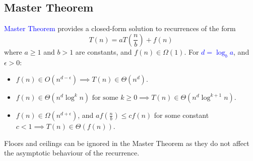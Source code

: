 \subsection{Master Theorem}
\textcolor{Blue}{Master Theorem} provides a \textcolor{Bittersweet}{closed-form solution} to recurrences of the form
\[T(n)=aT\left( \frac{n}{b} \right) +f(n)\] 
where $a\ge 1$ and $b>1$ are constants, and $f(n)\in\Omega\left( 1 \right) $.
For \textcolor{Blue}{$d=\log_b{a}$}, and  $\epsilon>0$:
\begin{itemize}
  \item $f(n)\in O\left( n^{d-\epsilon} \right) \implies T(n)\in \Theta\left(
    n^d \right) $.
  \item $f(n)\in \Theta\left( n^d \log^{k}{n} \right) \text{ for some
    }k\ge 0\implies T(n)\in \Theta\left( n^d\log^{k+1} n \right) $.
  \item $f(n)\in \Omega\left( n^{d+\epsilon} \right) $, and $af\left(
    \frac{n}{b} \right) \le cf(n)$ for some constant $c<1\implies T(n)\in
    \Theta(f(n))$.
\end{itemize}
Floors and ceilings can be ignored in the Master Theorem as they
\textcolor{Bittersweet}{do not affect the asymptotic behaviour} of the
recurrence.
